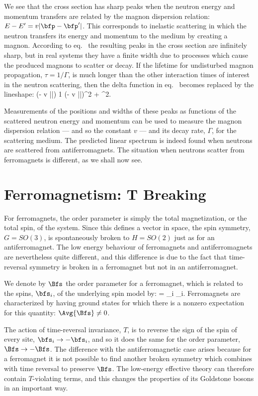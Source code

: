 \documentclass[12pt,epsf]{report}
\begin{document}
We see that the cross section has sharp peaks when the
neutron energy and momentum transfers are related by the
magnon dispersion relation: $E - E' = v|\bfp - \bfp'|$.
This corresponds to inelastic scattering in which the
neutron transfers its energy and momentum to the medium by
creating a magnon. According to
eq.~ the resulting peaks in the
cross section are infinitely sharp, but in real systems
they have a finite width due to processes which cause the
produced magnons to scatter or decay. If the lifetime for
undisturbed magnon propagation, $\tau = 1/\Gamma$, is much
longer than the other interaction times of interest in the
neutron scattering, then the delta function in
eq.~ becomes replaced by the
lineshape:
%
\eq
\label{resultwithwidthincluded}
\delta(\omega - v |\bfq|) \to { \Gamma \over 2 \pi} 
\; {1 \over (\omega - v
|\bfq|)^2 +  \; \Gamma^2}.
\eeq

Measurements of the positions and widths of these peaks as
functions of the scattered neutron energy and momentum can
be used to measure the magnon dispersion relation --- and
so the constant $v$ --- and its decay rate, $\Gamma$, for
the scattering medium. The predicted linear spectrum is
indeed found when neutrons are scattered from
antiferromagnets. The situation when neutrons scatter from
ferromagnets is different, as we shall now see.

\section{Ferromagnetism: T Breaking}

For ferromagnets, the order parameter is simply the total
magnetization, or the total spin, of the system. Since this
defines a vector in space, the spin symmetry, $G = SO(3)$,
is spontaneously broken to $H = SO(2)$ just as for an
antiferromagnet. The low energy behaviour of ferromagnets
and antiferromagnets are nevertheless quite different, and
this difference is due to the fact that time-reversal
symmetry is broken in a ferromagnet but not in an
antiferromagnet.

We denote by $\Bfs$ the order parameter for a ferromagnet,
which is related to the spins, $\bfs_i$, of the underlying
spin model by:  
%
\eq
\label{forderparam}
\Bfs = \sum_i \bfs_i.
\eeq
%
Ferromagnets are characterized by having ground states for
which there is a nonzero expectation for this quantity:
$\Avg{ \Bfs} \neq 0$.

The action of time-reversal invariance, $T$, is to reverse
the sign of the spin of every site, $\bfs_i \to - \bfs_i$,
and so it does the same for the order parameter, $\Bfs \to
- \Bfs$. The difference with the antiferromagnetic case
arises because for a ferromagnet it is not possible to find
another broken symmetry which combines with time reversal to
preserve $\Bfs$. The low-energy effective theory can
therefore contain $T$-violating terms, and this changes the
properties of its Goldstone bosons in an important way.
\end{document}
